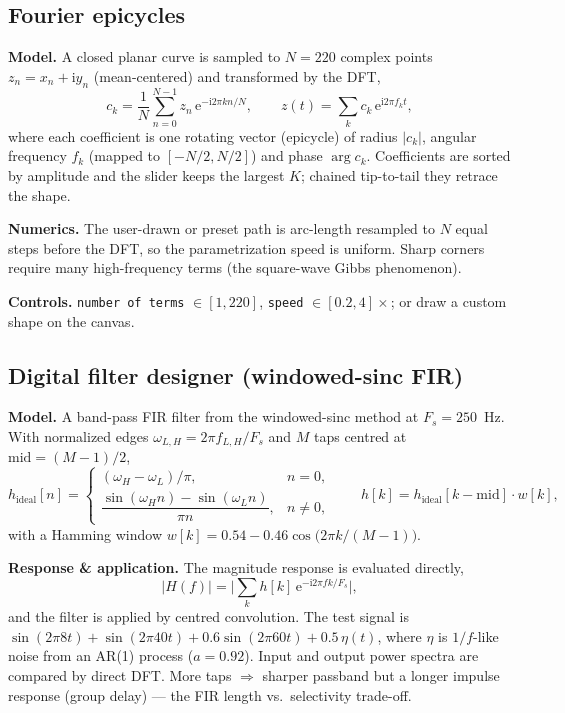\documentclass[11pt]{article}
\newcommand{\param}[1]{\textcolor{neonmag}{\texttt{#1}}}
\newcommand{\E}{\mathrm{e}}
\newcommand{\ii}{\mathrm{i}}
\begin{document}
\subsection{Fourier epicycles}

\textbf{Model.} A closed planar curve is sampled to $N=220$ complex points
$z_n = x_n + \ii y_n$ (mean-centered) and transformed by the DFT,
\[
c_k = \frac1N \sum_{n=0}^{N-1} z_n\, \E^{-\ii 2\pi kn/N}, \qquad
z(t) = \sum_{k} c_k\, \E^{\ii 2\pi f_k t},
\]
where each coefficient is one rotating vector (epicycle) of radius $|c_k|$, angular frequency
$f_k$ (mapped to $[-N/2, N/2]$) and phase $\arg c_k$. Coefficients are sorted by amplitude and
the slider keeps the largest $K$; chained tip-to-tail they retrace the shape.

\textbf{Numerics.} The user-drawn or preset path is arc-length resampled to $N$ equal steps
before the DFT, so the parametrization speed is uniform. Sharp corners require many
high-frequency terms (the square-wave Gibbs phenomenon).

\textbf{Controls.} \param{number of terms} $\in[1,220]$, \param{speed} $\in[0.2,4]\times$;
or draw a custom shape on the canvas.

\subsection{Digital filter designer (windowed-sinc FIR)}

\textbf{Model.} A band-pass FIR filter from the windowed-sinc method at $F_s = 250$~Hz. With
normalized edges $\omega_{L,H} = 2\pi f_{L,H}/F_s$ and $M$ taps centred at $\text{mid}=(M{-}1)/2$,
\[
h_{\text{ideal}}[n] =
\begin{cases}
(\omega_H - \omega_L)/\pi, & n = 0,\\[4pt]
\dfrac{\sin(\omega_H n) - \sin(\omega_L n)}{\pi n}, & n \ne 0,
\end{cases}
\qquad h[k] = h_{\text{ideal}}[k-\text{mid}]\cdot w[k],
\]
with a Hamming window $w[k] = 0.54 - 0.46\cos\!\big(2\pi k/(M-1)\big)$.

\textbf{Response \& application.} The magnitude response is evaluated directly,
\[
|H(f)| = \Big|\textstyle\sum_k h[k]\,\E^{-\ii 2\pi f k / F_s}\Big|,
\]
and the filter is applied by centred convolution. The test signal is
$\sin(2\pi 8t) + \sin(2\pi 40 t) + 0.6\sin(2\pi 60 t) + 0.5\,\eta(t)$,
where $\eta$ is $1/f$-like noise from an AR(1) process ($a=0.92$). Input and output power spectra
are compared by direct DFT. More taps $\Rightarrow$ sharper passband but a longer impulse
response (group delay) --- the FIR length vs.\ selectivity trade-off.
\end{document}
